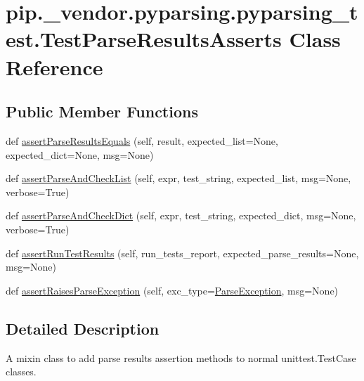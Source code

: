 \hypertarget{classpip_1_1__vendor_1_1pyparsing_1_1pyparsing__test_1_1TestParseResultsAsserts}{}\section{pip.\+\_\+vendor.\+pyparsing.\+pyparsing\+\_\+test.\+Test\+Parse\+Results\+Asserts Class Reference}
\label{classpip_1_1__vendor_1_1pyparsing_1_1pyparsing__test_1_1TestParseResultsAsserts}
\subsection*{Public Member Functions}
\begin{DoxyCompactItemize}
\item 
def \hyperlink{classpip_1_1__vendor_1_1pyparsing_1_1pyparsing__test_1_1TestParseResultsAsserts_aaf51deb00e547fe71636fbc50ca93016}{assert\+Parse\+Results\+Equals} (self, result, expected\+\_\+list=None, expected\+\_\+dict=None, msg=None)
\item 
def \hyperlink{classpip_1_1__vendor_1_1pyparsing_1_1pyparsing__test_1_1TestParseResultsAsserts_a4475842cf72c70710e9c7b1f653188b5}{assert\+Parse\+And\+Check\+List} (self, expr, test\+\_\+string, expected\+\_\+list, msg=None, verbose=True)
\item 
def \hyperlink{classpip_1_1__vendor_1_1pyparsing_1_1pyparsing__test_1_1TestParseResultsAsserts_a6300718396c5effc37353e2420ad3ad7}{assert\+Parse\+And\+Check\+Dict} (self, expr, test\+\_\+string, expected\+\_\+dict, msg=None, verbose=True)
\item 
def \hyperlink{classpip_1_1__vendor_1_1pyparsing_1_1pyparsing__test_1_1TestParseResultsAsserts_a49a1a64a47b2e6e94d7c9e4e7bc3a7a6}{assert\+Run\+Test\+Results} (self, run\+\_\+tests\+\_\+report, expected\+\_\+parse\+\_\+results=None, msg=None)
\item 
def \hyperlink{classpip_1_1__vendor_1_1pyparsing_1_1pyparsing__test_1_1TestParseResultsAsserts_abe8f7ad84221fa8c4219a689fafa7778}{assert\+Raises\+Parse\+Exception} (self, exc\+\_\+type=\hyperlink{classpip_1_1__vendor_1_1pyparsing_1_1ParseException}{Parse\+Exception}, msg=None)
\end{DoxyCompactItemize}


\subsection{Detailed Description}
\begin{DoxyVerb}A mixin class to add parse results assertion methods to normal unittest.TestCase classes.
\end{DoxyVerb}
 

